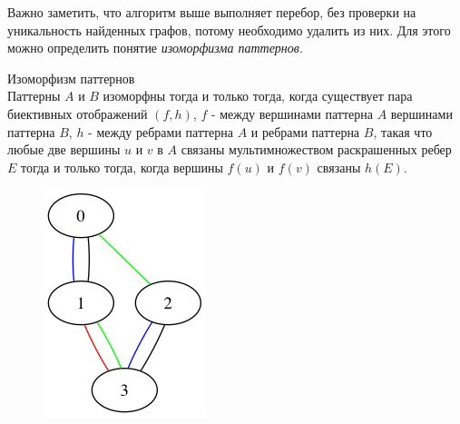 Важно заметить, что алгоритм выше выполняет перебор, без проверки на уникальность найденных графов, потому необходимо удалить  из них.
Для этого можно определить понятие \textit{изоморфизма паттернов}.
\begin{define}{Изоморфизм паттернов} \\
  Паттерны $A$ и $B$ изоморфны тогда и только тогда, когда существует пара биективных отображений $(f, h)$,
  $f$ - между вершинами паттерна $A$ вершинами паттерна $B$, $h$ - между ребрами паттерна $A$ и ребрами паттерна $B$,
  такая что любые две вершины $u$ и $v$ в $A$ связаны мультимножеством раскрашенных ребер $E$ тогда и только тогда, когда вершины
  $f(u)$ и $f(v)$ связаны $h(E)$.
\end{define}
\vspace{-2em}
\begin{figure}[H]
  \centering
  \includegraphics[max width=\linewidth]{fig/2/patterns/similar1.png}

\end{figure}
